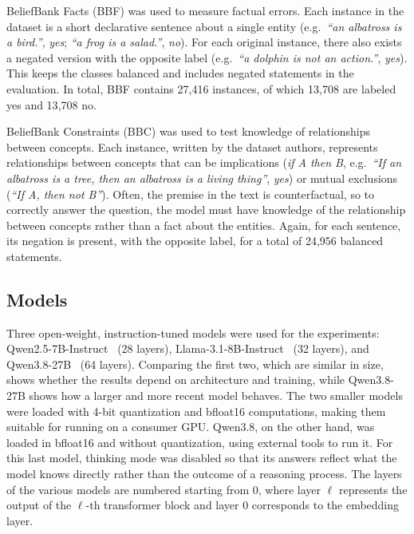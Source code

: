 \documentclass{article}
\begin{document}
BeliefBank Facts (BBF) was used to measure factual errors. Each instance in the dataset is a short declarative sentence about a single entity (e.g.\ \textit{``an albatross is a bird.''}, \textit{yes}; \textit{``a frog is a salad.''}, \textit{no}). For each original instance, there also exists a negated version with the opposite label (e.g.\ \textit{``a dolphin is not an action.''}, \textit{yes}). This keeps the classes balanced and includes negated statements in the evaluation. In total, BBF contains 27{,}416 instances, of which 13{,}708 are labeled yes and 13{,}708 no.

BeliefBank Constraints (BBC) was used to test knowledge of relationships between concepts. Each instance, written by the dataset authors, represents relationships between concepts that can be implications (\textit{if A then B}, e.g.\ \textit{``If an albatross is a tree, then an albatross is a living thing''}, \textit{yes}) or mutual exclusions (\textit{``If A, then not B''}). Often, the premise in the text is counterfactual, so to correctly answer the question, the model must have knowledge of the relationship between concepts rather than a fact about the entities. Again, for each sentence, its negation is present, with the opposite label, for a total of 24{,}956 balanced statements.


\subsection{Models}
\label{sec:materials_models}
Three open-weight, instruction-tuned models were used for the experiments: Qwen2.5-7B-Instruct~\cite{qwen25} (28 layers), Llama-3.1-8B-Instruct~\cite{llama} (32 layers), and Qwen3.8-27B~\cite{qwen38} (64 layers). Comparing the first two, which are similar in size, shows whether the results depend on architecture and training, while Qwen3.8-27B shows how a larger and more recent model behaves. The two smaller models were loaded with 4-bit quantization and bfloat16 computations, making them suitable for running on a consumer GPU. Qwen3.8, on the other hand, was loaded in bfloat16 and without quantization, using external tools to run it. For this last model, thinking mode was disabled so that its answers reflect what the model knows directly rather than the outcome of a reasoning process. The layers of the various models are numbered starting from 0, where layer $\ell$ represents the output of the $\ell$-th transformer block and layer 0 corresponds to the embedding layer.
\end{document}
